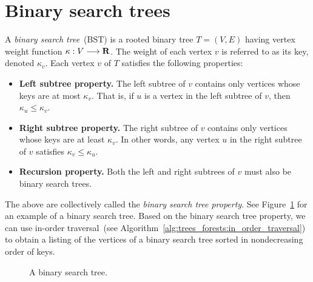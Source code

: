 
\section{Binary search trees}
\label{sec:tree_data_structures:binary_search_trees}

A \emph{binary search tree}~(BST)
is a rooted binary tree $T = (V,E)$ having vertex weight function
$\kappa: V \longrightarrow \mathbf{R}$. The weight of each vertex $v$ is referred to as
its key, denoted $\kappa_v$. Each vertex $v$ of $T$ satisfies the
following properties:
\begin{itemize}
\item \textbf{Left subtree property.}
  The left subtree of $v$ contains only vertices whose keys are at
  most $\kappa_v$. That is, if $u$ is a vertex in the left subtree of
  $v$, then $\kappa_u \leq \kappa_v$.

\item \textbf{Right subtree property.}
  The right subtree of $v$ contains only vertices whose keys are at
  least $\kappa_v$. In other words, any vertex $u$ in the right
  subtree of $v$ satisfies $\kappa_v \leq \kappa_u$.

\item \textbf{Recursion property.}
  Both the left and right subtrees of $v$ must also be binary search
  trees.
\end{itemize}
The above are collectively called the
\emph{binary search tree property}.
See Figure~\ref{fig:tree_data_structures:binary_search_tree} for an
example of a binary search tree. Based on the binary search tree
property, we can use in-order traversal~(see
Algorithm~\ref{alg:trees_forests:in_order_traversal}) to obtain a
listing of the vertices of a binary search tree sorted in
nondecreasing order of keys.

\begin{figure}[!htbp]
\centering
{}

\caption{A binary search tree.}
\label{fig:tree_data_structures:binary_search_tree}
\end{figure}



